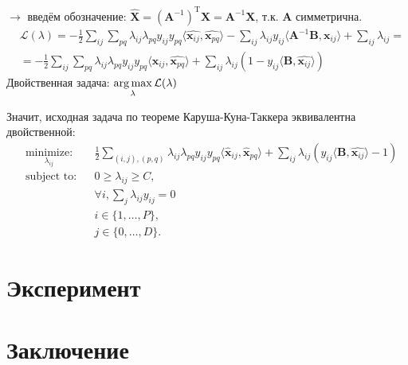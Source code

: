 \documentclass[12pt,twoside]{article}
\begin{document}
$\rightarrow$ введём обозначение:
$\widehat{\mathbf{X}} = (\mathbf{A}^{-1})^{\text{T}}\mathbf{X} = \mathbf{A}^{-1}\mathbf{X}$, т.к. $ \mathbf{A}$ симметрична.
\begin{equation}
\begin{aligned}
& \mathcal{L}(\lambda) = - \frac{1}{2} \sum_{ij}\sum_{pq} {\lambda_{ij}\lambda_{pq}y_{ij}y_{pq}\langle \widehat{\mathbf{x}_{ij}}, \widehat{\mathbf{x}_{pq}} \rangle} - 
\sum_{ij}{\lambda_{ij}y_{ij}\langle \mathbf{A}^{-1}\mathbf{B}, \mathbf{x}_{ij} \rangle} + \sum_{ij}{\lambda_{ij}} = \\
& = - \frac{1}{2} \sum_{ij}\sum_{pq} {\lambda_{ij}\lambda_{pq}y_{ij}y_{pq}\langle \widehat{\mathbf{x}_{ij}}, \widehat{\mathbf{x}_{pq}}  \rangle} + 
\sum_{ij}{\lambda_{ij} \left(1  - y_{ij}\langle \mathbf{B}, \widehat{\mathbf{x}_{ij}} \rangle \right)}
\end{aligned}
\end{equation}
Двойственная задача: $\argmax_{\lambda} \mathcal{L}(\lambda)$

Значит, исходная задача по теореме Каруша-Куна-Таккера эквивалентна двойственной:
\begin{equation}\label{eq19}
\begin{aligned}
& \underset{\lambda_{ij}}{\text{minimize:}}
& & \frac{1}{2}\sum\limits_{(i,j),(p,q)}\lambda_{ij}\lambda_{pq}y_{ij}y_{pq}\langle \widehat{\mathbf{x}}_{ij},\widehat{\mathbf{x}}_{pq}\rangle + \sum_{ij}{\lambda_{ij} \left(y_{ij}\langle \mathbf{B}, \widehat{\mathbf{x}_{ij}} \rangle - 1 \right)} \\
& \text{subject to:}
& & 0\geq\lambda_{ij}\geq C, \\
&&& \forall i, \sum_j{\lambda_{ij}y_{ij}} = 0 \\
&&&i\in\{1,\dots,P\}, \\
&&&j\in\{0,\dots,D\}.
\end{aligned}
\end{equation}

\section{Эксперимент}


\section{Заключение}
\end{document}
